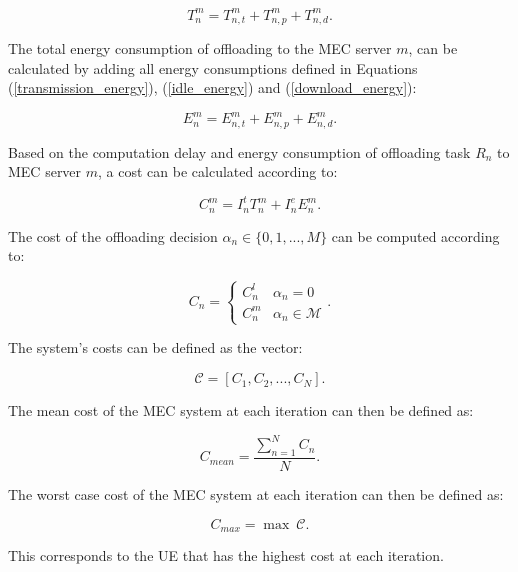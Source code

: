 \begin{equation}
    T_n^m = T_{n,t}^m + T_{n,p}^m + T_{n, d}^m .
\end{equation}

The total energy consumption of offloading to the \acrshort{MEC} server $m$, can be calculated by adding all energy consumptions defined in Equations (\ref{transmission_energy}), (\ref{idle_energy}) and (\ref{download_energy}):

\begin{equation}
    E_n^m = E_{n,t}^m + E_{n,p}^m + E_{n, d}^m .
\end{equation}

Based on the computation delay and energy consumption of offloading task $R_n$ to \acrshort{MEC} server $m$, a cost can be calculated according to:

\begin{equation}
    C_n^m = I_n^t T_n^m + I_n^e E_n^m .
\end{equation}

The cost of the offloading decision $\alpha_n \in \{0, 1, ..., M\}$ can be computed according to:

\begin{equation}
    C_n =
    \begin{cases}
        C_n^l & \alpha_n = 0             \\
        C_n^m & \alpha_n \in \mathcal{M}
    \end{cases} .
\end{equation}

The system's costs can be defined as the vector:

\begin{equation}
    \mathcal{C} = [C_1, C_2, ..., C_N].
\end{equation}


The mean cost of the \acrshort{MEC} system at each iteration can then be defined as:

\begin{equation}
    C_{mean} = \frac{\sum\limits_{n=1}^N C_n}{N}.
\end{equation}

The worst case cost of the \acrshort{MEC} system at each iteration can then be defined as:

\begin{equation}
    C_{max} = \max \ \mathcal{C}.
\end{equation}

This corresponds to the \acrshort{UE} that has the highest cost at each iteration.

